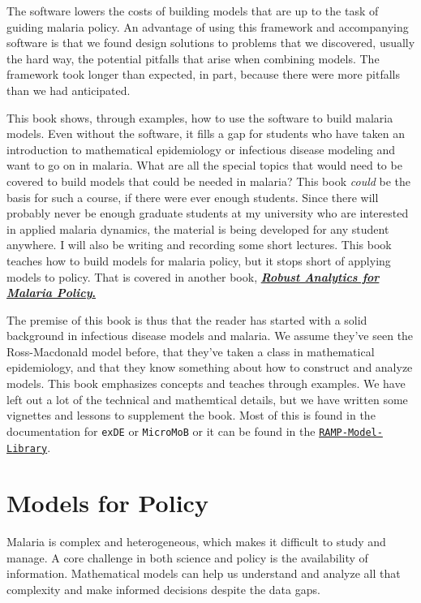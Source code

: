 \documentclass[
]{book}
\begin{document}
The software lowers the costs of building models that are up to the task of guiding malaria policy.
An advantage of using this framework and accompanying software is that we found design solutions to problems that we discovered, usually the hard way, the potential pitfalls that arise when combining models.
The framework took longer than expected, in part, because there were more pitfalls than we had anticipated.

This book shows, through examples, how to use the software to build malaria models.
Even without the software, it fills a gap for students who have taken an introduction to mathematical epidemiology or infectious disease modeling and want to go on in malaria.
What are all the special topics that would need to be covered to build models that could be needed in malaria?
This book \emph{could} be the basis for such a course, if there were ever enough students.
Since there will probably never be enough graduate students at my university who are interested in applied malaria dynamics, the material is being developed for any student anywhere.
I will also be writing and recording some short lectures.
This book teaches how to build models for malaria policy, but it stops short of applying models to policy. That is covered in another book, \href{../../RAMP-Book/_book/index.html}{\textbf{\emph{Robust Analytics for Malaria Policy}.}}

The premise of this book is thus that the reader has started with a solid background in infectious disease models and malaria. We assume they've seen the Ross-Macdonald model before, that they've taken a class in mathematical epidemiology, and that they know something about how to construct and analyze models. This book emphasizes concepts and teaches through examples. We have left out a lot of the technical and mathemtical details, but we have written some vignettes and lessons to supplement the book. Most of this is found in the documentation for \texttt{exDE} or \texttt{MicroMoB} or it can be found in the \href{../../RAMP-Model-Library/RAMP-Model-Library.html}{\texttt{RAMP-Model-Library}}.

\hypertarget{models-for-policy}{%
\section*{Models for Policy}\label{models-for-policy}}

Malaria is complex and heterogeneous, which makes it difficult to study and manage. A core challenge in both science and policy is the availability of information. Mathematical models can help us understand and analyze all that complexity and make informed decisions despite the data gaps.
\end{document}

